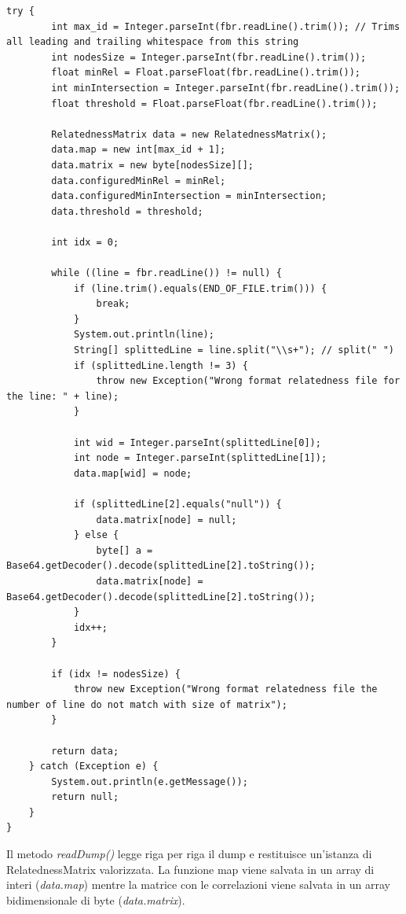 \begin{lstlisting}[style=JavaStyle]
    try {   
        int max_id = Integer.parseInt(fbr.readLine().trim()); // Trims all leading and trailing whitespace from this string         
        int nodesSize = Integer.parseInt(fbr.readLine().trim());
        float minRel = Float.parseFloat(fbr.readLine().trim());
        int minIntersection = Integer.parseInt(fbr.readLine().trim());
        float threshold = Float.parseFloat(fbr.readLine().trim());         

        RelatednessMatrix data = new RelatednessMatrix();
        data.map = new int[max_id + 1];
        data.matrix = new byte[nodesSize][];
        data.configuredMinRel = minRel;
        data.configuredMinIntersection = minIntersection;
        data.threshold = threshold;

        int idx = 0;

        while ((line = fbr.readLine()) != null) {
            if (line.trim().equals(END_OF_FILE.trim())) {
                break;
            }
            System.out.println(line);
            String[] splittedLine = line.split("\\s+"); // split(" ")
            if (splittedLine.length != 3) {
                throw new Exception("Wrong format relatedness file for the line: " + line);
            }

            int wid = Integer.parseInt(splittedLine[0]);
            int node = Integer.parseInt(splittedLine[1]);
            data.map[wid] = node;

            if (splittedLine[2].equals("null")) {
                data.matrix[node] = null;
            } else {
                byte[] a = Base64.getDecoder().decode(splittedLine[2].toString()); 
                data.matrix[node] = Base64.getDecoder().decode(splittedLine[2].toString());
            }
            idx++;
        }
        
        if (idx != nodesSize) {
            throw new Exception("Wrong format relatedness file the number of line do not match with size of matrix");
        }
        
        return data;
    } catch (Exception e) {
        System.out.println(e.getMessage());
        return null;
    }
}
\end{lstlisting}

Il metodo \textit{readDump()} legge riga per riga il dump e restituisce un'istanza di RelatednessMatrix valorizzata. 
La funzione map viene salvata in un array di interi (\textit{data.map}) mentre la matrice con le correlazioni viene salvata in un 
array bidimensionale di byte (\textit{data.matrix}).

